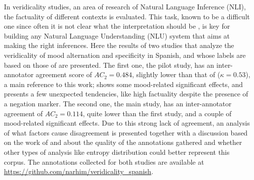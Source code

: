 In veridicality studies, an area of research of Natural Language Inference (NLI), the factuality of different contexts is evaluated. This task, known to be a difficult one since often it is not clear what the interpretation should be \citet{uma2021learning}, is key for building any Natural Language Understanding (NLU) system that aims at making the right inferences. Here the results of two studies that analyze the veridicality of mood alternation and specificity in Spanish, and whose labels are based on those of \citet{sauri2009factbank} are presented. The first one, the pilot study, has an inter-annotator agreement score of $AC_2=0.484$, slightly lower than that of \citet{de2012did} ($\kappa = 0.53$), a main reference to this work; shows some mood-related significant effects, and presents a few unexpected tendencies, like  high factuality despite the presence of a negation marker. The second one, the main study, has an inter-annotator agreement of $AC_2=0.114$, quite lower than the first study, and a couple of mood-related significant effects. Due to this strong lack of agreement, an analysis of what factors cause disagreement is presented together with a discussion based on the work of \citet{de2012did} and \citet{pavlick2019inherent} about the quality of the annotations gathered and whether other types of analysis like entropy distribution could better represent this corpus. The annotations collected for both studies are available at \url{https://github.com/narhim/veridicality_spanish}.